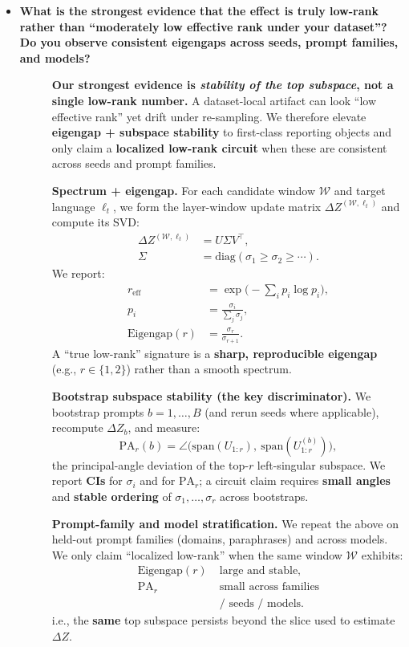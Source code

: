 \begin{itemize}[leftmargin=1.5em]


\item[\ding{93}] \textbf{What is the strongest evidence that the effect is truly low-rank rather than “moderately low effective rank under your dataset”? Do you observe consistent eigengaps across seeds, prompt families, and models?}
\begin{description}
\item[] \textbf{Our strongest evidence is \emph{stability of the top subspace}, not a single low-rank number.}
A dataset-local artifact can look “low effective rank” yet drift under re-sampling. We therefore elevate \textbf{eigengap + subspace stability} to first-class reporting objects and only claim a \textbf{localized low-rank circuit} when these are consistent across seeds and prompt families.

\vspace{3pt}
\textbf{Spectrum + eigengap.} For each candidate window $\mathcal{W}$ and target language $\ell_t$, we form the layer-window update matrix $\Delta Z^{(\mathcal{W},\ell_t)}$ and compute its SVD:
\[
\begin{aligned}
\Delta Z^{(\mathcal{W},\ell_t)} &= U\Sigma V^\top,\\
\Sigma &= \mathrm{diag}(\sigma_1\ge \sigma_2\ge \cdots).
\end{aligned}
\]
We report:
\[
\begin{aligned}
r_{\mathrm{eff}} &= \exp\!\Big(-\sum_i p_i\log p_i\Big),\\
p_i &= \frac{\sigma_i}{\sum_j \sigma_j},\\
\mathrm{Eigengap}(r) &= \frac{\sigma_r}{\sigma_{r+1}}.
\end{aligned}
\]
A “true low-rank” signature is a \textbf{sharp, reproducible eigengap} (e.g., $r\in\{1,2\}$) rather than a smooth spectrum.

\vspace{3pt}
\textbf{Bootstrap subspace stability (the key discriminator).}
We bootstrap prompts $b=1,\dots,B$ (and rerun seeds where applicable), recompute $\Delta Z_b$, and measure:
\[
\mathrm{PA}_r(b)=\angle\big(\mathrm{span}(U_{1:r}),\ \mathrm{span}(U^{(b)}_{1:r})\big),
\]
the principal-angle deviation of the top-$r$ left-singular subspace. We report \textbf{CIs} for $\sigma_i$ and for $\mathrm{PA}_r$; a circuit claim requires \textbf{small angles} and \textbf{stable ordering} of $\sigma_1,\dots,\sigma_r$ across bootstraps.

\vspace{3pt}
\textbf{Prompt-family and model stratification.}
We repeat the above on held-out prompt families (domains, paraphrases) and across models. We only claim “localized low-rank” when the same window $\mathcal{W}$ exhibits:
\[
\begin{aligned}
\mathrm{Eigengap}(r) \;&\text{large and stable},\\
\mathrm{PA}_r \;&\text{small across families}\\
               &\text{/ seeds / models}.
\end{aligned}
\]
i.e., the \textbf{same} top subspace persists beyond the slice used to estimate $\Delta Z$.


\end{description}
\end{itemize}
